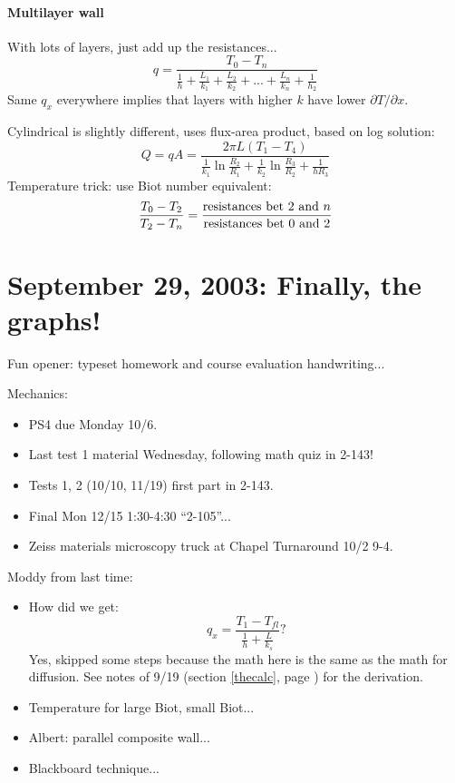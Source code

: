 \documentclass{report}
\begin{document}
\paragraph{Multilayer wall}

With lots of layers, just add up the resistances...
$$q = \frac{T_0-T_n}{\frac{1}{h} + \frac{L_1}{k_1} + \frac{L_2}{k_2} + ... +
  \frac{L_n}{k_n} + \frac{1}{h_2}}$$
Same $q_x$ everywhere implies that layers with higher $k$ have lower $\partial
  T/\partial x$.

Cylindrical is slightly different, uses flux-area product, based on log
solution:
$$Q=qA = \frac{2\pi L(T_1-T_4)}{\frac{1}{k_1}\ln\frac{R_2}{R_1}+
  \frac{1}{k_2}\ln\frac{R_3}{R_2}+\frac{1}{hR_3}}$$
Temperature trick: use Biot number equivalent:
$$\frac{T_0-T_2}{T_2-T_n} = \frac{{\rm resistances\ bet\ 2\ and\ }n}
{\rm resistances\ bet\ 0\ and\ 2}$$
\newpage


\section{September 29, 2003: Finally, the graphs!}

Fun opener: typeset homework and course evaluation handwriting...

\noindent Mechanics:
\begin{itemize}
\item PS4 due Monday 10/6.
\item Last test 1 material Wednesday, following math quiz in 2-143!
\item Tests 1, 2 (10/10, 11/19) first part in 2-143.
\item Final Mon 12/15 1:30-4:30 ``2-105''...
\item Zeiss materials microscopy truck at Chapel Turnaround 10/2 9-4.
\end{itemize}

\noindent Moddy from last time:
\begin{itemize}
\item How did we get:
  $$q_x = \frac{T_1-T_{fl}}{\frac{1}{h} + \frac{L}{k_s}}?$$
  Yes, skipped some steps because the math here is the same as the math for
  diffusion.  See notes of 9/19 (section \ref{thecalc}, page \pageref{thecalc})
  for the derivation.
\item Temperature for large Biot, small Biot...
\item Albert: parallel composite wall...
\item Blackboard technique...
\end{itemize}
\end{document}

